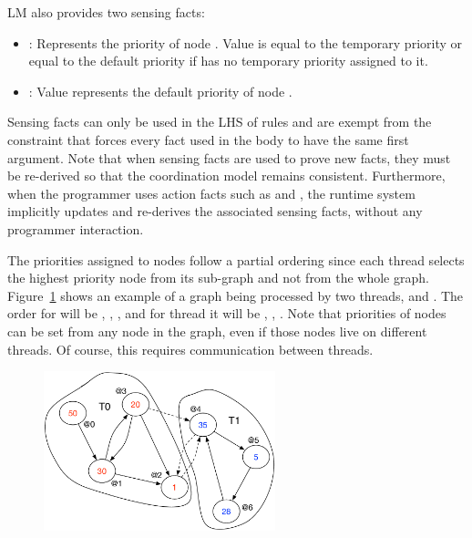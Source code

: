 LM also provides two sensing facts:

\begin{itemize}
	\item {}: Represents the priority of node . Value  is equal to the temporary priority or equal to the default priority if  has no temporary priority assigned to it.
	\item {}: Value  represents the default priority of node .
\end{itemize}

Sensing facts can only be used in the LHS of rules and are exempt from the constraint that
forces every fact used in the body to have the same first argument. Note
that when sensing facts are used to prove new facts, they must be re-derived so that the coordination model remains consistent.
Furthermore, when the programmer uses action facts such as  and
, the runtime system implicitly updates and re-derives the associated sensing facts, without any programmer interaction.

The priorities assigned to nodes follow a partial ordering since each thread selects the highest priority node from its sub-graph and not from the whole graph.
Figure~\ref{fig:coordination:priorities} shows an example of a graph being
processed by two threads,  and . The order for  will
be , , ,  and for thread  it will
be , , .
Note that priorities of nodes can be set from any node in the graph, even if those nodes
live on different threads. Of course, this requires communication between
threads.

\begin{figure}
\begin{center}
   \includegraphics[width=0.6\textwidth]{figures/coordination/priorities.pdf}
\end{center}
\label{fig:coordination:priorities}
\end{figure}
